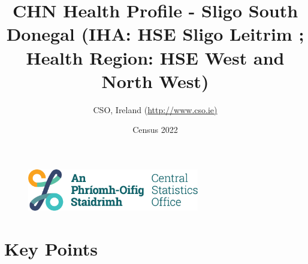 \documentclass{article}
\title{CHN Health Profile - Sligo South Donegal (IHA: HSE Sligo Leitrim ;  Health Region: HSE West and North West) }
\date{Census 2022}
\author{CSO, Ireland  (\url{http://www.cso.ie)}}
\begin{document}


\begin{figure}
	\centering
\includegraphics[width =75mm]{../figures/CSO_Logo.png}
\end{figure}

				 
		   
						  
														  
																																													
												 
			 
\maketitle
					
													   
				 
						 
																																																																											   
				 
				  
  \pagebreak
    	    \tableofcontents

\pagebreak


\section{Key Points}
\end{document}
